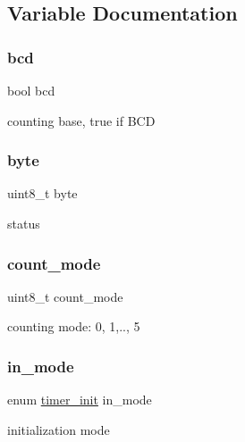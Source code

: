 \subsection{Variable Documentation}
\mbox{\label{group__timer_gaa2444cde256beeae6fb06bb7a5ebd0c9}} 
\subsubsection{\texorpdfstring{bcd}{bcd}}
{\footnotesize\ttfamily bool bcd}

counting base, true if B\+CD \mbox{\label{group__timer_ga96f44d20f1dbf1c8785a7bc99a46164c}} 
\subsubsection{\texorpdfstring{byte}{byte}}
{\footnotesize\ttfamily uint8\+\_\+t byte}

status \mbox{\label{group__timer_gabd6e94a182fc2daff67dfb46f732644a}} 
\subsubsection{\texorpdfstring{count\+\_\+mode}{count\_mode}}
{\footnotesize\ttfamily uint8\+\_\+t count\+\_\+mode}

counting mode\+: 0, 1,.., 5 \mbox{\label{group__timer_gad414fb8742e435f9bda1f199a6200645}} 
\subsubsection{\texorpdfstring{in\+\_\+mode}{in\_mode}}
{\footnotesize\ttfamily enum \hyperlink{group__timer_ga5cc20f14fd50625eea9b20f58fbe2a55}{timer\+\_\+init} in\+\_\+mode}

initialization mode 